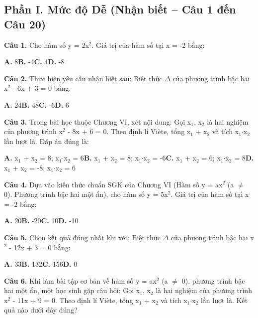\documentclass[11pt,a4paper]{article}
\begin{document}
\subsection*{\color{accent} Phần I. Mức độ Dễ (Nhận biết -- Câu 1 đến Câu 20)}
\textbf{\color{primary} Câu 1.} Cho hàm số y = 2x$^2$. Giá trị của hàm số tại x = -2 bằng:\par
\hspace*{1.5em}\textbf{A.} 8\quad\quad \textbf{B.} -4\quad\quad \textbf{C.} 4\quad\quad \textbf{D.} -8\par\vspace{2pt}
\textbf{\color{primary} Câu 2.} Thực hiện yêu cầu nhận biết sau: Biệt thức $\Delta$ của phương trình bậc hai x$^2$ - 6x + 3 = 0 bằng.\par
\hspace*{1.5em}\textbf{A.} 24\quad\quad \textbf{B.} 48\quad\quad \textbf{C.} -6\quad\quad \textbf{D.} 6\par\vspace{2pt}
\textbf{\color{primary} Câu 3.} Trong bài học thuộc Chương VI, xét nội dung: Gọi x$_1$, x$_2$ là hai nghiệm của phương trình x$^2$ - 8x + 6 = 0. Theo định lí Viète, tổng x$_1$ + x$_2$ và tích x$_1$$\cdot$x$_2$ lần lượt là. Đáp án đúng là:\par
\hspace*{1.5em}\textbf{A.} x$_1$ + x$_2$ = 8; x$_1$$\cdot$x$_2$ = 6\quad\quad \textbf{B.} x$_1$ + x$_2$ = 8; x$_1$$\cdot$x$_2$ = -6\quad\quad \textbf{C.} x$_1$ + x$_2$ = 6; x$_1$$\cdot$x$_2$ = 8\quad\quad \textbf{D.} x$_1$ + x$_2$ = -8; x$_1$$\cdot$x$_2$ = 6\par\vspace{2pt}
\textbf{\color{primary} Câu 4.} Dựa vào kiến thức chuẩn SGK của Chương VI (Hàm số y = ax$^2$ (a $\ne$ 0). Phương trình bậc hai một ẩn), cho hàm số y = 5x$^2$. Giá trị của hàm số tại x = -2 bằng:\par
\hspace*{1.5em}\textbf{A.} 20\quad\quad \textbf{B.} -20\quad\quad \textbf{C.} 10\quad\quad \textbf{D.} -10\par\vspace{2pt}
\textbf{\color{primary} Câu 5.} Chọn kết quả đúng nhất khi xét: Biệt thức $\Delta$ của phương trình bậc hai x$^2$ - 12x + 3 = 0 bằng:\par
\hspace*{1.5em}\textbf{A.} 33\quad\quad \textbf{B.} 132\quad\quad \textbf{C.} 156\quad\quad \textbf{D.} 0\par\vspace{2pt}
\textbf{\color{primary} Câu 6.} Khi làm bài tập cơ bản về hàm số y = ax$^2$ (a $\ne$ 0). phương trình bậc hai một ẩn, một học sinh gặp câu hỏi: Gọi x$_1$, x$_2$ là hai nghiệm của phương trình x$^2$ - 11x + 9 = 0. Theo định lí Viète, tổng x$_1$ + x$_2$ và tích x$_1$$\cdot$x$_2$ lần lượt là. Kết quả nào dưới đây đúng?\par
\end{document}
